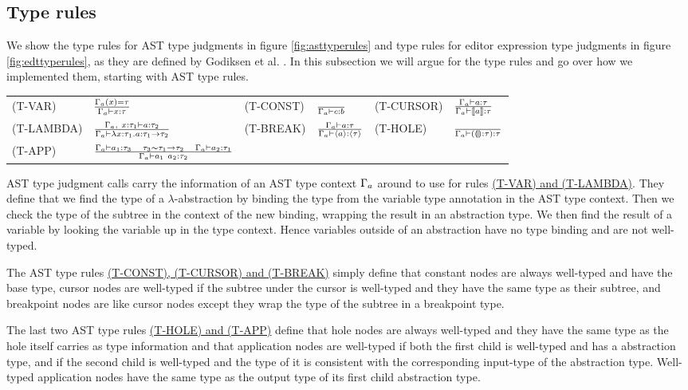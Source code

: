 \subsection{Type rules}

We show the type rules for AST type judgments in figure \ref{fig:asttyperules}
and type rules for editor expression type judgments in figure
\ref{fig:edttyperules}, as they are defined by Godiksen et al. \pepm. In this
subsection we will argue for the type rules and go over how we implemented
them, starting with AST type rules.\\

\begin{figure*}
  \center
  \renewcommand{\arraystretch}{2}
  \begin{tabular}{llllll}
    \scriptsize(T-VAR)    & $ \frac{\Gamma_{a}(x) = \tau} {\Gamma_{a} \vdash x : \tau} $   & \scriptsize(T-CONST) & $ \frac{} {\Gamma_{a} \vdash c : b}$ & \scriptsize(T-CURSOR) & $ \frac{\Gamma_{a} \vdash a : \tau} {\Gamma_{a} \vdash \llbracket a \rrbracket : \tau} $ \\
    \scriptsize(T-LAMBDA) & $ \frac{\Gamma_{a},~x : \tau_1 \vdash a : \tau_2} {\Gamma_{a} \vdash \lambda x : \tau_1.a : \tau_1\to\tau_2}$ & \scriptsize(T-BREAK) & $\frac{\Gamma_{a} \vdash a : \tau} {\Gamma_{a} \vdash \langle a \rangle : \langle \tau \rangle}$  & \scriptsize(T-HOLE)   & $\frac{} {\Gamma_{a} \vdash (\llparenthesis\rrparenthesis : \tau) : \tau}$     \\
    \scriptsize(T-APP)    & $\frac{\Gamma_{a} \vdash a_1 : \tau_3 \quad \tau_3\sim\tau_1\to\tau_2 \quad \Gamma_{a} \vdash a_2 : \tau_1} {\Gamma_{a} \vdash a_1~a_2 : \tau_2}$     &                      &            &                       &
  \end{tabular}
  \caption{AST type rules}
  \label{fig:asttyperules}
\end{figure*}

AST type judgment calls carry the information of an AST type context $\Gamma_{a}$
around to use for rules \hyperref[fig:asttyperules]{(T-VAR) and (T-LAMBDA)}.
They define that we find the type of a $\lambda$-abstraction by binding the type
from the variable type annotation in the AST type context. Then we check
the type of the subtree in the context of the new binding, wrapping the
result in an abstraction type. We then find the result of a variable by looking
the variable up in the type context. Hence variables outside of an abstraction
have no type binding and are not well-typed.

The AST type rules \hyperref[fig:asttyperules]{(T-CONST), (T-CURSOR) and
(T-BREAK)} simply define that constant nodes are always well-typed and have the
base type, cursor nodes are well-typed if the subtree under the cursor is
well-typed and they have the same type as their subtree, and breakpoint nodes
are like cursor nodes except they wrap the type of the subtree in a breakpoint
type.

The last two AST type rules \hyperref[fig:asttyperules]{(T-HOLE) and (T-APP)}
define that hole nodes are always well-typed and they have the same type as
the hole itself carries as type information and that application nodes are
well-typed if both the first child is well-typed and has a abstraction type,
and if the second child is well-typed and the type of it is consistent with the
corresponding input-type of the abstraction type. Well-typed application nodes
have the same type as the output type of its first child abstraction type. \\

